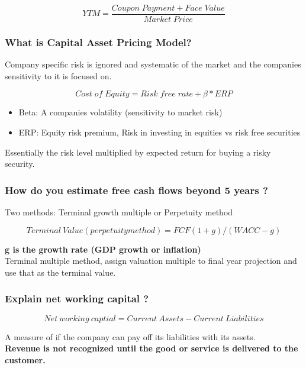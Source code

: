 \documentclass[11pt]{scrartcl} %
\begin{document}
\[ YTM = \frac{Coupon\;Payment + Face\;Value}{Market\;Price} \]

\subsubsection{What is Capital Asset Pricing Model?}

Company specific risk is ignored and systematic of the market and the companies sensitivity to it is focused on.

\begin{equation}
	Cost\;of\;Equity = Risk\;free\;rate + \beta * ERP
\end{equation}

\begin{itemize}
	\item Beta: A companies volatility (sensitivity to market risk)
	\item ERP: Equity risk premium, Risk in investing in equities vs risk free securities
\end{itemize}

Essentially the risk level multiplied by expected return for buying a risky security.

\subsubsection{How do you estimate free cash flows beyond 5 years ?}

Two methods: Terminal growth multiple or Perpetuity method

\[ Terminal\:Value(perpetuity method) = FCF(1+g)/(WACC-g) \]

\textbf{g is the growth rate (GDP growth or inflation)} \\

Terminal multiple method, assign valuation multiple to final year projection and use that as the terminal value.



\subsubsection{Explain net working capital ?}

\[ Net\:working\:captial = Current\:Assets - Current\:Liabilities \]

A measure of if the company can pay off its liabilities with its assets. \\

\textbf{Revenue is not recognized until the good or service is delivered to the customer.}
\end{document}
